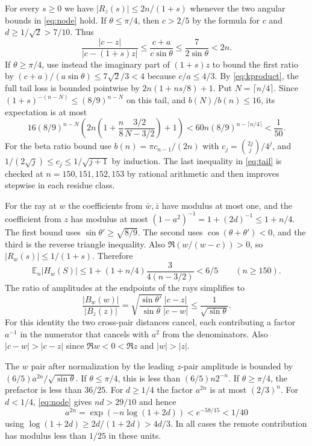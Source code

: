 \documentclass[11pt]{article}
\begin{document}
For every $s\ge0$ we have $|R_z(s)|\le 2n/(1+s)$ whenever the two angular bounds in \eqref{eq:node} hold. If $\theta\le\pi/4$, then $c>2/5$ by the formula for $c$ and $d\ge1/\sqrt2>7/10$. Thus
\[
\frac{|c-z|}{|c-(1+s)z|}
\le\frac{c+a}{c\sin\theta}
\le\frac{7}{2\sin\theta}<2n .
\]
If $\theta\ge\pi/4$, use instead the imaginary part of $(1+s)z$ to bound the first ratio by $(c+a)/(a\sin\theta)\le7\sqrt2/3<4$ because $c/a\le4/3$. By \eqref{eq:kproduct}, the full tail loss is bounded pointwise by $2n(1+ns/8)+1$. Put $N=\lceil n/4\rceil$. Since $(1+s)^{-(n-N)}\le(8/9)^{n-N}$ on this tail, and $b(N)/b(n)\le16$, its expectation is at most
\begin{equation}
16(8/9)^{n-N}\left(2n\left(1+\frac n8\frac{3/2}{N-3/2}\right)+1\right)
<60n(8/9)^{n-\lceil n/4\rceil}<\frac1{50}.
\label{eq:tail}
\end{equation}
For the beta ratio bound use $b(n)=\pi c_{n-1}/(2n)$ with $c_j=\binom{2j}{j}/4^j$, and $1/(2\sqrt j)\le c_j\le1/\sqrt{j+1}$ by induction. The last inequality in \eqref{eq:tail} is checked at $n=150,151,152,153$ by rational arithmetic and then improves stepwise in each residue class.

For the ray at $w$ the coefficients from $\bar w,\bar z$ have modulus at most one, and the coefficient from $z$ has modulus at most $(1-a^2)^{-1}=1+(2d)^{-1}\le 1+n/4$. The first bound uses $\sin\theta'\ge \sqrt{8/9}$. The second uses $\cos(\theta+\theta')<0$, and the third is the reverse triangle inequality. Also $\Re(w/(w-c))>0$, so $|R_w(s)|\le1/(1+s)$. Therefore
\[
\mathbb E_n |H_w(S)|\le1+(1+n/4)\frac{3}{4(n-3/2)}<6/5
\qquad(n\ge150).
\]
The ratio of amplitudes at the endpoints of the rays simplifies to
\begin{equation}
\frac{|B_w(w)|}{|B_z(z)|}
=\sqrt{\frac{\sin\theta'}{\sin\theta}}\frac{|c-z|}{|c-w|}
\le \frac1{\sqrt{\sin\theta}} .
\label{eq:remote}
\end{equation}
For this identity the two cross-pair distances cancel, each contributing a factor $a^{-1}$ in the numerator that cancels with $a^2$ from the denominators. Also $|c-w|>|c-z|$ since $\Re w<0<\Re z$ and $|w|>|z|$.

The $w$ pair after normalization by the leading $z$-pair amplitude is bounded by $(6/5)a^{2n}/\sqrt{\sin\theta}$. If $\theta\le\pi/4$, this is less than $(6/5)n2^{-n}$. If $\theta\ge\pi/4$, the prefactor is less than $36/25$. For $d\ge1/4$ the factor $a^{2n}$ is at most $(2/3)^n$. For $d<1/4$, \eqref{eq:node} gives $nd>29/10$ and hence
\[
a^{2n}=\exp(-n\log(1+2d))<e^{-58/15}<1/40
\]
using $\log(1+2d)\ge 2d/(1+2d)>4d/3$. In all cases the remote contribution has modulus less than $1/25$ in these units.
\end{document}
